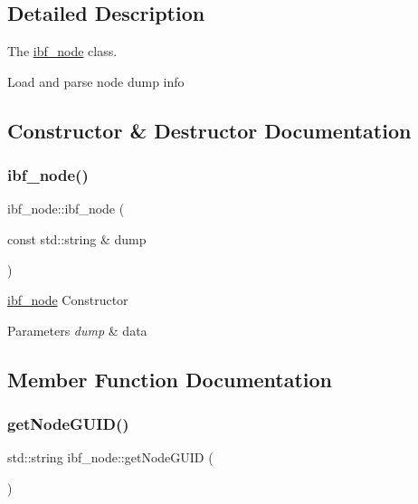 \subsection{Detailed Description}
The \mbox{\hyperlink{classibf__node}{ibf\+\_\+node}} class. 

Load and parse node dump info 

\subsection{Constructor \& Destructor Documentation}
\mbox{\label{classibf__node_a523e0518169d8e30b68d9188a51b6c1a}} 
\subsubsection{\texorpdfstring{ibf\+\_\+node()}{ibf\_node()}}
{\footnotesize\ttfamily ibf\+\_\+node\+::ibf\+\_\+node (\begin{DoxyParamCaption}\item[{const std\+::string \&}]{dump }\end{DoxyParamCaption})}



\mbox{\hyperlink{classibf__node}{ibf\+\_\+node}} Constructor 


\begin{DoxyParams}{Parameters}
{\em dump} & data \\
\hline
\end{DoxyParams}


\subsection{Member Function Documentation}
\mbox{\label{classibf__node_afe265cfd9c0423988b063c0356058a99}} 
\subsubsection{\texorpdfstring{get\+Node\+G\+U\+I\+D()}{getNodeGUID()}}
{\footnotesize\ttfamily std\+::string ibf\+\_\+node\+::get\+Node\+G\+U\+ID (\begin{DoxyParamCaption}{ }\end{DoxyParamCaption})\hspace{0.3cm}{\ttfamily [inline]}}




